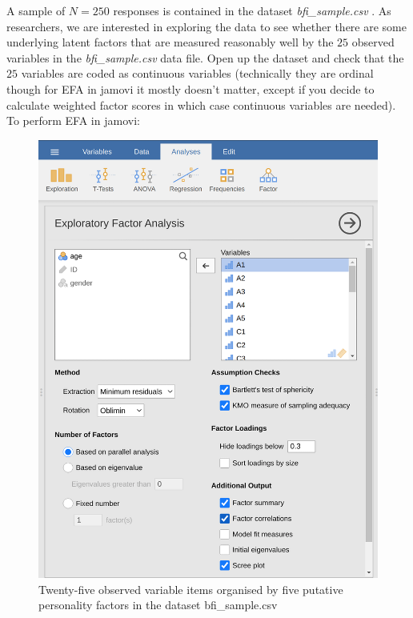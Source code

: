 \documentclass[
  a4paper,
]{book}
\begin{document}
A sample of \(N=250\) responses is contained in the dataset
\emph{bfi\_sample.csv} . As researchers, we are interested in exploring
the data to see whether there are some underlying latent factors that
are measured reasonably well by the \(25\) observed variables in the
\emph{bfi\_sample.csv} data file. Open up the dataset and check that the
\(25\) variables are coded as continuous variables (technically they are
ordinal though for EFA in jamovi it mostly doesn't matter, except if you
decide to calculate weighted factor scores in which case continuous
variables are needed). To perform EFA in jamovi:

\begin{figure}

\includegraphics[width=1\textwidth,height=\textheight]{images/fig15-2.png} \hfill{}

\caption{\label{fig-fig15-2}Twenty-five observed variable items
organised by five putative personality factors in the dataset
bfi\_sample.csv}

\end{figure}
\end{document}
